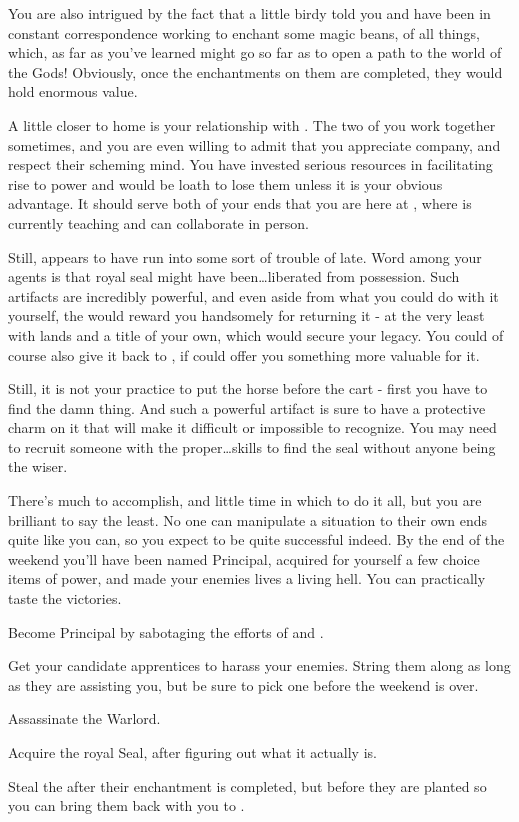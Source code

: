 \documentclass[char]{GL2020}
\begin{document}
You are also intrigued by the fact that a little birdy told you \cCurse{} and \cFlowPriest{} have been in constant correspondence working to enchant some magic beans, of all things, which, as far as you’ve learned might go so far as to open a path to the world of the Gods!  Obviously, once the enchantments on them are completed, they would hold enormous value.

A little closer to home is your relationship with \cPrince{}. The two of you work together sometimes, and you are even willing to admit that you appreciate \cPrince{\their} company, and respect their scheming mind. You have invested serious resources in facilitating \cPrince{\their} rise to power and would be loath to lose them unless it is your obvious advantage. It should serve both of your ends that you are here at \pSchool{}, where \cPrince{} is currently teaching and can collaborate in person. 

Still, \cPrince{} appears to have run into some sort of trouble of late. Word among your agents is that \cPrince{\their} royal seal might have been\ldots liberated from \cPrince{\their} possession. Such artifacts are incredibly powerful, and even aside from what you could do with it yourself, the \cQueen{\Majesty} would reward you handsomely for returning it - at the very least with lands and a title of your own, which would secure your legacy. You could of course also give it back to \cPrince{}, if \cPrince{\they} could offer you something more valuable for it. 

Still, it is not your practice to put the horse before the cart - first you have to find the damn thing. And such a powerful artifact is sure to have a protective charm on it that will make it difficult or impossible to recognize. You may need to recruit someone with the proper\ldots skills to find the seal without anyone being the wiser.

There’s much to accomplish, and little time in which to do it all, but you are brilliant to say the least.  No one can manipulate a situation to their own ends quite like you can, so you expect to be quite successful indeed.  By the end of the weekend you’ll have been named Principal, acquired for yourself a few choice items of power, and made your enemies lives a living hell.  You can practically taste the victories.


\begin{itemz}[Goals]
	\item Become Principal by sabotaging the efforts of \cMusic{} and \cBeetle{}.
	\item Get your candidate apprentices to harass your enemies. String them along as long as they are assisting you, but be sure to pick one before the weekend is over.
\item Assassinate the \pShippies{} Warlord.
\item Acquire the \pFarm{} royal Seal, after figuring out what it actually is.
\item Steal the \iBeans{} after their enchantment is completed, but before they are planted so you can bring them back with you to \pFarm{}.
\end{itemz}
\end{document}
